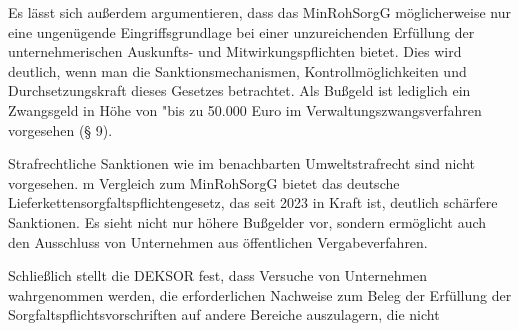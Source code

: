\documentclass[12pt,a4paper,oneside]{book} %
\begin{document}
Es lässt sich außerdem argumentieren, dass das MinRohSorgG möglicherweise nur eine ungenügende Eingriffsgrundlage bei einer unzureichenden Erfüllung der unternehmerischen Auskunfts- und Mitwirkungspflichten bietet.  Dies wird deutlich, wenn man die Sanktionsmechanismen, Kontrollmöglichkeiten und Durchsetzungskraft dieses Gesetzes betrachtet. Als Bußgeld ist lediglich ein Zwangsgeld in Höhe von "bis zu 50.000 Euro im Verwaltungszwangsverfahren vorgesehen (§ 9).


Strafrechtliche Sanktionen wie im benachbarten Umweltstrafrecht sind nicht vorgesehen. m Vergleich zum MinRohSorgG bietet das deutsche Lieferkettensorgfaltspflichtengesetz, das seit 2023 in Kraft ist, deutlich schärfere Sanktionen. Es sieht nicht nur höhere Bußgelder vor, sondern ermöglicht auch den Ausschluss von Unternehmen aus öffentlichen Vergabeverfahren. 

Schließlich stellt die DEKSOR fest, dass Versuche von Unternehmen wahrgenommen werden, die erforderlichen Nachweise zum Beleg der Erfüllung der Sorgfaltspflichtsvorschriften auf andere Bereiche auszulagern, die nicht 

\end{document}
